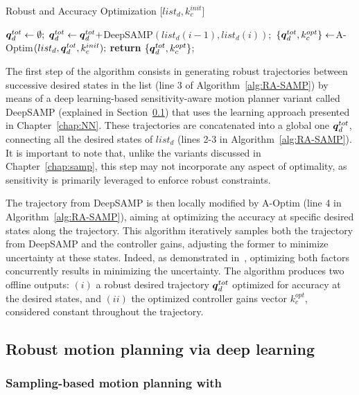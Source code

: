 \begin{algorithm}[htp]
\caption{Robust and Accuracy Optimization [$list_{d}, k_{c}^{init}$]}\label{alg:RA-SAMP}
\begin{algorithmic}[1]
\State $\boldsymbol{q}_d^{tot} \gets \emptyset;$
    \State $\boldsymbol{q}_d^{tot} \gets \boldsymbol{q}_d^{tot} + $DeepSAMP$(list_{d}(i-1),list_{d}(i));$
\EndFor
\State $\left \{ \boldsymbol{q}_d^{tot}, k_{c}^{opt} \right \} \gets $A-Optim$(list_{d},\boldsymbol{q}_d^{tot}, k_{c}^{init});$
\State \textbf{return} $\left \{ \boldsymbol{q}_d^{tot}, k_{c}^{opt}  \right \}$;
\end{algorithmic}
\end{algorithm}

The first step of the algorithm consists in generating robust trajectories between successive desired states in the list (line 3 of Algorithm~\ref{alg:RA-SAMP}) by means of a deep learning-based sensitivity-aware motion planner variant called DeepSAMP (explained in Section~\ref{sec:RSAMP}) that uses the learning approach presented in Chapter~\ref{chap:NN}.
These trajectories are concatenated into a global one $\boldsymbol{q}_d^{tot}$, connecting all the desired states of $list_{d}$ (lines 2-3 in Algorithm~\ref{alg:RA-SAMP}). 
It is important to note that, unlike the variants discussed in Chapter~\ref{chap:samp}, this step may not incorporate any aspect of optimality, as sensitivity is primarily leveraged to enforce robust constraints.

The trajectory from DeepSAMP is then locally modified by A-Optim (line 4 in Algorithm~\ref{alg:RA-SAMP}), aiming at optimizing the accuracy at specific desired states along the trajectory. 
This algorithm iteratively samples both the trajectory from DeepSAMP and the controller gains, adjusting the former to minimize uncertainty at these states. 
Indeed, as demonstrated in~\cite{AliIROS}, optimizing both factors concurrently results in minimizing the uncertainty.
The algorithm produces two offline outputs: $(i)$ a robust desired trajectory $\boldsymbol{q}_d^{tot}$ optimized for accuracy at the desired states, and $(ii)$ the optimized controller gains vector $k_{c}^{opt}$, considered constant throughout the trajectory.

\subsection{Robust motion planning via deep learning}\label{sec:RSAMP}

\subsubsection{Sampling-based motion planning with }

